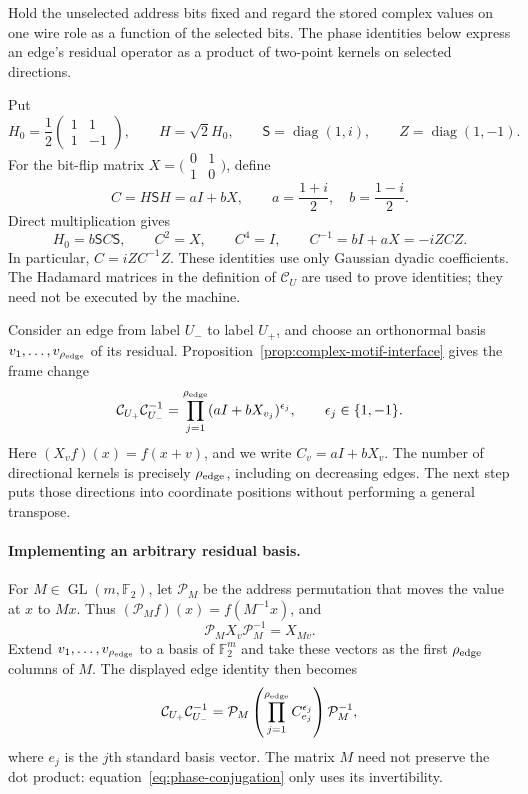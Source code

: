 Hold the unselected address bits fixed and regard the stored complex
values on one wire role as a function of the selected bits.  The phase
identities below express an edge's residual operator as a product of
two-point kernels on selected directions.

Put
\[
 H_0=\frac12\begin{pmatrix}1&1\\1&-1\end{pmatrix},\qquad
 H=\sqrt2 H_0,\qquad \mathsf S=\operatorname{diag}(1,i),\qquad
 Z=\operatorname{diag}(1,-1).
\]
For the bit-flip matrix $X=\bigl(\begin{smallmatrix}0&1\\1&0\end{smallmatrix}\bigr)$,
define
\begin{equation}\label{eq:phase-C}
 C=H\mathsf SH=aI+bX,\qquad a=\frac{1+i}{2},\quad b=\frac{1-i}{2}.
\end{equation}
Direct multiplication gives
\begin{equation}\label{eq:phase-basic-identities}
 H_0=b\mathsf SC\mathsf S,\qquad C^2=X,\qquad C^4=I,\qquad
 C^{-1}=bI+aX=-iZCZ.
\end{equation}
In particular, $C=iZC^{-1}Z$.  These identities use only Gaussian dyadic
coefficients.  The Hadamard matrices in the definition of
$\mathcal C_U$ are used to prove identities; they need not be executed
by the machine.

Consider an edge from label $U_-$ to label $U_+$, and choose an
orthonormal basis $v_1,\ldots,v_{\rho_{\rm edge}}$ of its residual.
Proposition~\ref{prop:complex-motif-interface} gives the frame change
\[
 \mathcal C_{U_+}\mathcal C_{U_-}^{-1}
 =\prod_{j=1}^{\rho_{\rm edge}}(aI+bX_{v_j})^{\epsilon_j},
 \qquad \epsilon_j\in\{1,-1\}.
\]
Here $(X_vf)(x)=f(x+v)$, and we write $C_v=aI+bX_v$.
The number of directional kernels is precisely
$\rho_{\rm edge}$, including on decreasing edges. The next step puts those directions
into coordinate positions without performing a general transpose.

\paragraph{Implementing an arbitrary residual basis.}
For $M\in\operatorname{GL}(m,\mathbb F_2)$, let $\mathcal P_M$ be the
address permutation that moves the value at $x$ to $Mx$.  Thus
$(\mathcal P_Mf)(x)=f(M^{-1}x)$, and
\begin{equation}\label{eq:phase-conjugation}
 \mathcal P_MX_v\mathcal P_M^{-1}=X_{Mv}.
\end{equation}
Extend $v_1,\ldots,v_{\rho_{\rm edge}}$ to a basis of $\mathbb F_2^m$ and take these vectors as
the first $\rho_{\rm edge}$ columns of $M$.  The displayed edge identity
then becomes
\begin{equation}\label{eq:phase-edge-coordinate}
 \mathcal C_{U_+}\mathcal C_{U_-}^{-1}
 =\mathcal P_M\left(\prod_{j=1}^{\rho_{\rm edge}}C_{e_j}^{\epsilon_j}\right)
   \mathcal P_M^{-1},
\end{equation}
where $e_j$ is the $j$th standard basis vector.  The matrix $M$ need not
preserve the dot product: equation~\eqref{eq:phase-conjugation} only
uses its invertibility.

